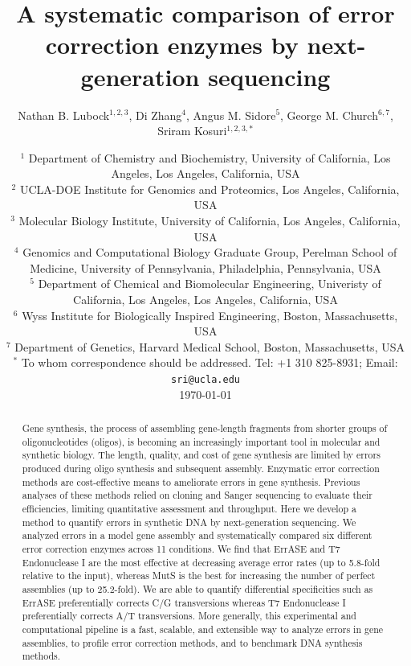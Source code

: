 \documentclass[twocolumn]{article}
\begin{document}
\title{A systematic comparison of error correction enzymes by next-generation sequencing}

\author{Nathan B. Lubock$^{1,2,3}$, Di Zhang$^{4}$, Angus M. Sidore$^5$, George M. Church$^{6,7}$,
Sriram Kosuri$^{1,2,3,*}$}


\date{%
	\footnotesize%
    $^1$ Department of Chemistry and Biochemistry, University of California, Los Angeles, Los Angeles, California, USA\\%
    $^2$ UCLA-DOE Institute for Genomics and Proteomics, Los Angeles, California, USA \\%
    $^3$ Molecular Biology Institute, University of California, Los Angeles, California, USA \\%
    $^4$ Genomics and Computational Biology Graduate Group, Perelman School of Medicine, University of Pennsylvania, Philadelphia, Pennsylvania, USA\\%
    $^5$ Department of Chemical and Biomolecular Engineering, Univeristy of California, Los Angeles, Los Angeles, California, USA\\%
    $^6$ Wyss Institute for Biologically Inspired Engineering, Boston, Massachusetts, USA\\%
    $^7$ Department of Genetics, Harvard Medical School, Boston, Massachusetts, USA \\%
    $^*$ To whom correspondence should be addressed. Tel: +1 310 825-8931; Email: \texttt{sri@ucla.edu} \\[2ex]%
    \small\today%
}
\maketitle

\begin{abstract}
Gene synthesis, the process of assembling gene-length fragments from shorter groups of oligonucleotides (oligos), is becoming an increasingly important tool in molecular and synthetic biology. The length, quality, and cost of gene synthesis are limited by errors produced during oligo synthesis and subsequent assembly. Enzymatic error correction methods are cost-effective means to ameliorate errors in gene synthesis. Previous analyses of these methods relied on cloning and Sanger sequencing to evaluate their efficiencies, limiting quantitative assessment and throughput. Here we develop a method to quantify errors in synthetic DNA by next-generation sequencing. We analyzed errors in a model gene assembly and systematically compared six different error correction enzymes across 11 conditions. We find that ErrASE and T7 Endonuclease I are the most effective at decreasing average error rates (up to 5.8-fold relative to the input), whereas MutS is the best for increasing the number of perfect assemblies (up to 25.2-fold). We are able to quantify differential specificities such as ErrASE preferentially corrects C/G transversions whereas T7 Endonuclease I preferentially corrects A/T transversions. More generally, this experimental and computational pipeline is a fast, scalable, and extensible way to analyze errors in gene assemblies, to profile error correction methods, and to benchmark DNA synthesis methods.
\end{abstract}
\end{document}
